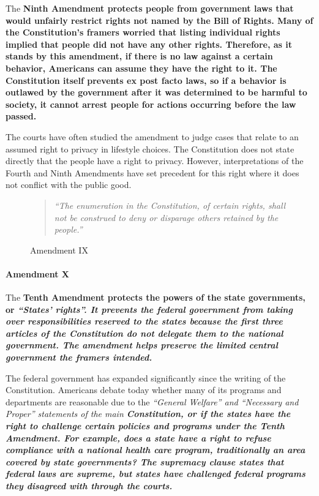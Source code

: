 The \bf{Ninth Amendment} protects people from government laws that would unfairly restrict rights not named by the \bf{Bill of Rights}. Many of the Constitution’s framers worried that listing individual rights implied that people did not have any other rights. Therefore, as it stands by this amendment, if there is no law against a certain behavior, Americans can assume they have the right to it. The Constitution itself prevents ex post facto laws, so if a behavior is outlawed by the government after it was determined to be harmful to society, it cannot arrest people for actions occurring before the law passed.

The courts have often studied the amendment to judge cases that relate to an assumed right to privacy in lifestyle choices. The Constitution does not state directly that the people have a right to privacy. However, interpretations of the Fourth and Ninth Amendments have set precedent for this right where it does not conflict with the public good.

\begin{figure}[h]
    \begin{quote}
        \it{“The enumeration in the Constitution, of certain rights, shall not be construed to deny or disparage others retained by the people.”}
    \end{quote}
    \caption{Amendment IX}
\end{figure}

\paragraph{Amendment X}

The \bf{Tenth Amendment} protects the powers of the state governments, or \it{“States’ rights”}. It prevents the federal government from taking over responsibilities reserved to the states because the first three articles of the Constitution do not delegate them to the national government. The amendment helps preserve the limited central government the framers intended.

The federal government has expanded significantly since the writing of the Constitution. Americans debate today whether many of its programs and departments are reasonable due to the \it{“General Welfare”} and \it{“Necessary and Proper”} statements of the main \bf{Constitution}, or if the states have the right to challenge certain policies and programs under the \bf{Tenth Amendment}. For example, does a state have a right to refuse compliance with a national health care program, traditionally an area covered by state governments? The supremacy clause states that federal laws are supreme, but states have challenged federal programs they disagreed with through the courts.

